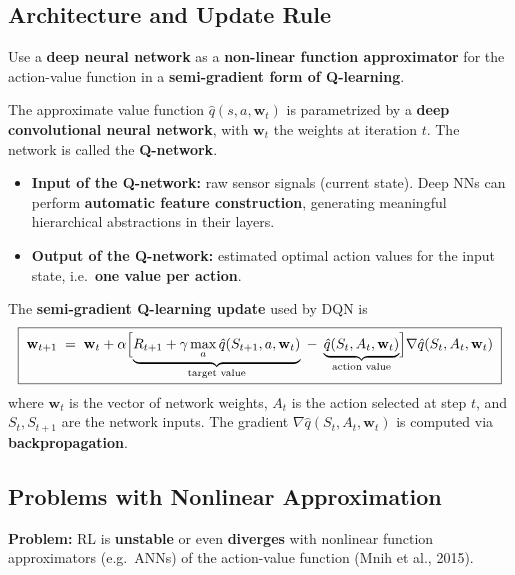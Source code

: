 \documentclass[11pt,a4paper]{article}
\theoremstyle{definition}
\theoremstyle{plain}
\theoremstyle{remark}
\begin{document}
\subsection{Architecture and Update Rule}

\begin{tcolorbox}[colback=blue!5!white, colframe=blue!60!black, title={Basic Idea of DQN}]
Use a \textbf{deep neural network} as a \textbf{non-linear function approximator} for the action-value function in a \textbf{semi-gradient form of Q-learning}.
\end{tcolorbox}

The approximate value function $\hat{q}(s, a, \mathbf{w}_t)$ is parametrized by a \textbf{deep convolutional neural network}, with $\mathbf{w}_t$ the weights at iteration $t$. The network is called the \textbf{Q-network}.
\begin{itemize}
    \item \textbf{Input of the Q-network:} raw sensor signals (current state). Deep NNs can perform \textbf{automatic feature construction}, generating meaningful hierarchical abstractions in their layers.
    \item \textbf{Output of the Q-network:} estimated optimal action values for the input state, i.e.\ \textbf{one value per action}.
\end{itemize}

The \textbf{semi-gradient Q-learning update} used by DQN is
\[
    \boxed{\;\mathbf{w}_{t+1} \;=\; \mathbf{w}_t + \alpha \Bigl[\underbrace{R_{t+1} + \gamma \max_{a} \hat{q}(S_{t+1}, a, \mathbf{w}_t)}_{\text{target value}} \;-\; \underbrace{\hat{q}(S_t, A_t, \mathbf{w}_t)}_{\text{action value}}\Bigr] \nabla \hat{q}(S_t, A_t, \mathbf{w}_t)\;}
\]
where $\mathbf{w}_t$ is the vector of network weights, $A_t$ is the action selected at step $t$, and $S_t, S_{t+1}$ are the network inputs. The gradient $\nabla \hat{q}(S_t, A_t, \mathbf{w}_t)$ is computed via \textbf{backpropagation}.

\subsection{Problems with Nonlinear Approximation}

\begin{tcolorbox}[colback=red!5!white, colframe=red!70!black, title={Instability of Nonlinear RL}]
\textbf{Problem:} RL is \textbf{unstable} or even \textbf{diverges} with nonlinear function approximators (e.g.\ ANNs) of the action-value function (Mnih et al., 2015).
\end{tcolorbox}
\end{document}
